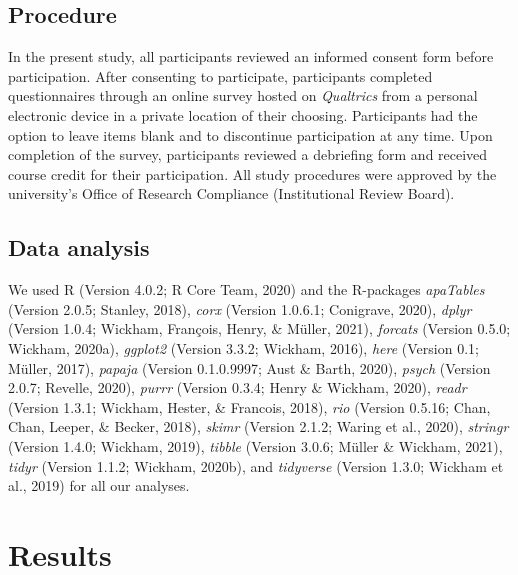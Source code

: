 \documentclass[
  english,
  man,draftall]{apa6}
\begin{document}
\hypertarget{procedure}{%
\subsection{Procedure}\label{procedure}}

In the present study, all participants reviewed an informed consent form before participation. After consenting to participate, participants completed questionnaires through an online survey hosted on \emph{Qualtrics} from a personal electronic device in a private location of their choosing. Participants had the option to leave items blank and to discontinue participation at any time. Upon completion of the survey, participants reviewed a debriefing form and received course credit for their participation. All study procedures were approved by the university's Office of Research Compliance (Institutional Review Board).

\hypertarget{data-analysis}{%
\subsection{Data analysis}\label{data-analysis}}

We used R (Version 4.0.2; R Core Team, 2020) and the R-packages \emph{apaTables} (Version 2.0.5; Stanley, 2018), \emph{corx} (Version 1.0.6.1; Conigrave, 2020), \emph{dplyr} (Version 1.0.4; Wickham, François, Henry, \& Müller, 2021), \emph{forcats} (Version 0.5.0; Wickham, 2020a), \emph{ggplot2} (Version 3.3.2; Wickham, 2016), \emph{here} (Version 0.1; Müller, 2017), \emph{papaja} (Version 0.1.0.9997; Aust \& Barth, 2020), \emph{psych} (Version 2.0.7; Revelle, 2020), \emph{purrr} (Version 0.3.4; Henry \& Wickham, 2020), \emph{readr} (Version 1.3.1; Wickham, Hester, \& Francois, 2018), \emph{rio} (Version 0.5.16; Chan, Chan, Leeper, \& Becker, 2018), \emph{skimr} (Version 2.1.2; Waring et al., 2020), \emph{stringr} (Version 1.4.0; Wickham, 2019), \emph{tibble} (Version 3.0.6; Müller \& Wickham, 2021), \emph{tidyr} (Version 1.1.2; Wickham, 2020b), and \emph{tidyverse} (Version 1.3.0; Wickham et al., 2019) for all our analyses.

\hypertarget{results}{%
\section{Results}\label{results}}
\end{document}

